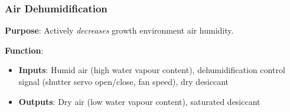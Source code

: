 \documentclass{report}
\begin{document}
\newpage

\subsubsection{Air Dehumidification}
\label{sec:dehum}

\textbf{Purpose}: Actively \textit{decreases} growth environment air humidity.

\textbf{Function}:
\begin{itemize}
    \item \textbf{Inputs}: Humid air (high water vapour content), dehumidification control signal (shutter servo open/close, fan speed), dry desiccant
    \item \textbf{Outputs}: Dry air (low water vapour content), saturated desiccant
\end{itemize}
\end{document}
